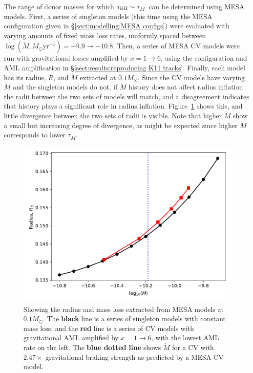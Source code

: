 The range of donor masses for which $\tau_{\rm KH} \sim \tau_{\dot M}$ can be determined using MESA models.
First, a series of singleton models (this time using the MESA configuration given in \S\ref{sect:modelling:MESA configs}) were evaluated with varying amounts of fixed mass loss rates, uniformly spaced between $\log (\dot M, M_\odot \mathrm{yr}^{-1}) = -9.9 \rightarrow -10.8$.
Then, a series of MESA CV models were run with gravitational losses amplified by $x = 1 \rightarrow 6$, using the configuration and AML amplification in \S\ref{sect:results:reproducing K11 tracks}.
Finally, each model has its radius, $R$, and $\dot M$ extracted at $0.1 M_\odot$. Since the CV models have varying $\dot M$ and the singleton models do not, if $\dot M$ history does not affect radius inflation the radii between the two sets of models will match, and a disagreement indicates that history plays a significant role in radius inflation.
 Figure~\ref{fig:results:comparing radii at 0.1Msun} shows this, and little divergence between the two sets of radii is visible. Note that higher $\dot M$ show a small but increasing degree of divergence, as might be expected since higher $\dot M$ corresponds to lower $\tau_{\dot M}$.
\begin{figure}
    \centering
    \includegraphics[width=.8\textwidth]{figures/modelling/compare_0.1Msun_with_CV_track_K11_fig1.pdf}
    \caption{Showing the radius and mass loss extracted from MESA models at $0.1 M_\odot$. The {\bf black} line is a series of singleton models with constant mass loss, and the {\bf red} line is a series of CV models with gravitational AML amplified by $x = 1 \rightarrow 6$, with the lowest AML rate on the left. The {\bf blue dotted line} shows $\dot M$ for a CV with $2.47\times$ gravitational braking strength as predicted by a MESA CV model.}
    \label{fig:results:comparing radii at 0.1Msun}
\end{figure}

